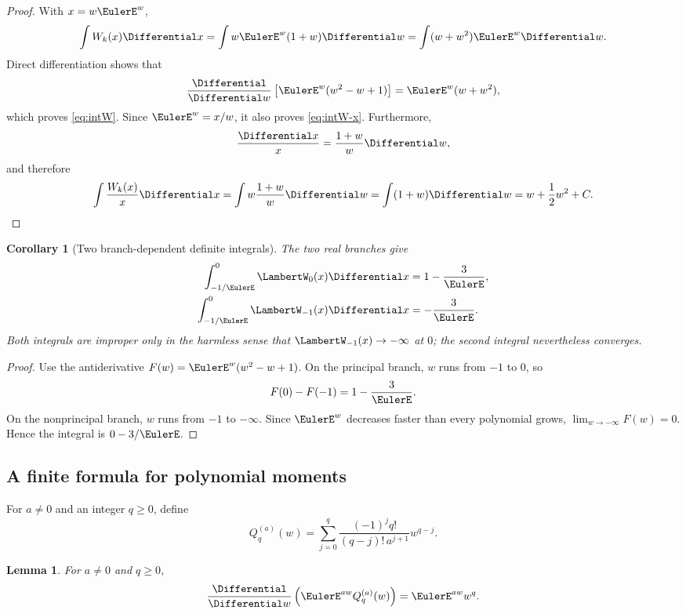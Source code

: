 \documentclass[11pt]{article}
\newtheorem{lemma}[lemma]{Lemma}
\newtheorem{corollary}[corollary]{Corollary}
\theoremstyle{remark}
\newcommand{\Wz}{\LambertW_{0}}
\newcommand{\Wm}{\LambertW_{-1}}
\begin{document}
\begin{proof}
With \(x=w\EulerE^w\),
\[
 \int W_k(x)\Differential x
 =\int w\EulerE^w(1+w)\Differential w
 =\int (w+w^2)\EulerE^w\Differential w.
\]
Direct differentiation shows that
\[
 \frac{\Differential}{\Differential w}
 \left[\EulerE^w(w^2-w+1)\right]
 =\EulerE^w(w+w^2),
\]
which proves \eqref{eq:intW}.  Since \(\EulerE^w=x/w\), it also proves
\eqref{eq:intW-x}.  Furthermore,
\[
 \frac{\Differential x}{x}=\frac{1+w}{w}\Differential w,
\]
and therefore
\[
 \int\frac{W_k(x)}x\Differential x
 =\int w\frac{1+w}{w}\Differential w
 =\int(1+w)\Differential w
 =w+\frac12w^2+C.
\]
\end{proof}

\begin{corollary}[Two branch-dependent definite integrals]\label{cor:defints}
The two real branches give
\begin{align}
 \int_{-1/\EulerE}^{0}\Wz(x)\Differential x&=1-\frac3\EulerE,\label{eq:defintW0}\\
 \int_{-1/\EulerE}^{0}\Wm(x)\Differential x&=-\frac3\EulerE.\label{eq:defintWm}
\end{align}
Both integrals are improper only in the harmless sense that
\(\Wm(x)\to-\infty\) at \(0\); the second integral nevertheless converges.
\end{corollary}

\begin{proof}
Use the antiderivative
\(F(w)=\EulerE^w(w^2-w+1)\).  On the principal branch,
\(w\) runs from \(-1\) to \(0\), so
\[
 F(0)-F(-1)=1-\frac3\EulerE.
\]
On the nonprincipal branch, \(w\) runs from \(-1\) to \(-\infty\).
Since \(\EulerE^w\) decreases faster than every polynomial grows,
\(\lim_{w\to-\infty}F(w)=0\).  Hence the integral is
\(0-3/\EulerE\).
\end{proof}

\subsection{A finite formula for polynomial moments}

For \(a\neq0\) and an integer \(q\geq0\), define
\begin{equation}\label{eq:Qpoly}
 Q_q^{(a)}(w)
 =\sum_{j=0}^{q}
   \frac{(-1)^j q!}{(q-j)!\,a^{j+1}}w^{q-j}.
\end{equation}

\begin{lemma}\label{lem:exp-poly}
For \(a\neq0\) and \(q\geq0\),
\[
       \frac{\Differential}{\Differential w}
       \left(\EulerE^{aw}Q_q^{(a)}(w)\right)
       =\EulerE^{aw}w^q.
\]
\end{lemma}
\end{document}

